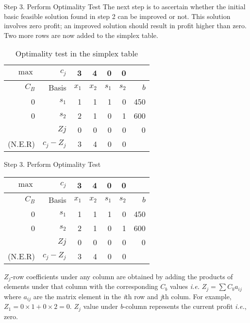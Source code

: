 \begin{frame}{Step 3. Perform Optimality Test}
  The next step is to ascertain whether the initial basic feasible solution found in step 2 can be improved or not. This solution involves zero profit; an improved solution should result in profit higher than zero. \alert{Two more rows are now added to the simplex table}.

  \begin{table}[h]
    \centering
    \caption{Optimality test in the simplex table}    \label{tab:simplex-table-optimalitytest}
    \begin{tabular}{rrrrrrr}
      \toprule
      $\max$& $c_j$  &3 &4 &0 &0 & \\
      \midrule
      $C_B$ &Basis&$x_1$&$x_2$&$s_1$&$s_2$&$b$\\
      \midrule
      0&$s_1$&1&1&1&0&450\\
      0&$s_2$&2&1&0&1&600\\
      \midrule
      &$Zj$&0&0&0&0&0\\
      (N.E.R)&$c_j - Z_j$&3&4&0&0&\\
      \bottomrule
    \end{tabular}
  \end{table}
\end{frame}

\begin{frame}{Step 3. Perform Optimality Test}{}
  {\centering
    \begin{tabular}{rrrrrrr}
      \toprule
      $\max$& $c_j$  &3 &4 &0 &0 & \\
      \midrule
      $C_B$ &Basis&$x_1$&$x_2$&$s_1$&$s_2$&$b$\\
      \midrule
      0&$s_1$&1&1&1&0&450\\
      0&$s_2$&2&1&0&1&600\\
      \midrule
      &$Zj$&0&0&0&0&0\\
      (N.E.R)&$c_j - Z_j$&3&4&0&0&\\
      \bottomrule
    \end{tabular}
    \par}

  $Z_j$-row coefficients under any column are obtained by adding the products of elements under that column with the corresponding $C_b$ values \emph{i.e.} $Z_j = \sum C_b a_{ij}$ where $a_{ij}$ are the matrix element in the \emph{i}th row and \emph{j}th colum. For example, $Z_1 = 0 \times 1 + 0 \times 2 = 0$. \alert{$Z_j$ value under \emph{b}-column represents the current profit \emph{i.e.}, zero}.
\end{frame}


